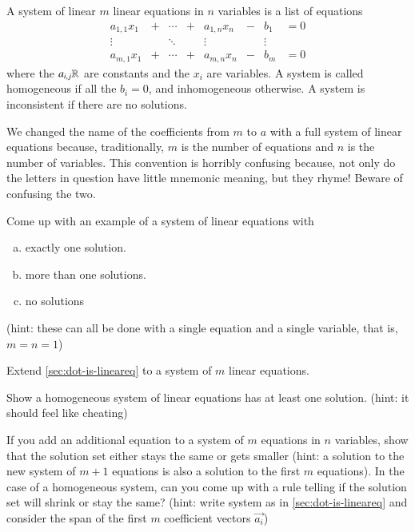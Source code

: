 \documentclass[Main.tex]{subfiles}
\begin{document}
\begin{Def}
  \label{sec:systemdef}
  A system of linear $m$ linear equations in $n$ variables is a list of equations
  \[\begin{array}{ccccccccc}
    a_{1,1}x_1 & + & \cdots & + & a_{1,n}x_n & - & b_1 & = 0\\
    \vdots     &   & \ddots &   & \vdots     &   & \vdots\\
    a_{m,1}x_1 & + & \cdots & + & a_{m,n}x_n & - & b_m & = 0
  \end{array}\]
  where the $a_{i,j}\mathbb{R}$ are constants and the $x_i$ are variables.
  A system is called homogeneous if all the $b_i=0$, and inhomogeneous otherwise.  
  A system is inconsistent if there are no solutions.  
\end{Def}

\begin{Remark}
  \label{sec:confusing}
  We changed the name of the coefficients from $m$ to $a$ with a full system of linear equations because, traditionally, 
  $m$ is the number of equations and $n$ is the number of variables.  
  This convention is horribly confusing because, not only do the letters in question have little mnemonic meaning, but they rhyme!  
  Beware of confusing the two.  
\end{Remark}

\begin{ImpEx}
  Come up with an example of a system of linear equations with
  \begin{enumerate}[a)]
  \item exactly one solution.
  \item more than one solutions.
  \item no solutions
  \end{enumerate}
  (hint: these can all be done with a single equation and a single variable, that is, $m=n=1$)
\end{ImpEx}

\begin{EasyEx}
  Extend \ref{sec:dot-is-lineareq} to a system of $m$ linear equations.  
\end{EasyEx}

\begin{EasyEx}
  Show a homogeneous system of linear equations has at least one solution.  (hint: it should feel like cheating)
\end{EasyEx}

\begin{Ex}
  If you add an additional equation to a system of $m$ equations in $n$ variables, show that the solution set either stays the same or gets smaller (hint: a solution to the new system of $m+1$ equations is also a solution to the first $m$ equations).  
  In the case of a homogeneous system, can you come up with a rule telling if the solution set will shrink or stay the same? (hint: write system as in \ref{sec:dot-is-lineareq} and consider the span of the first $m$ coefficient vectors $\vec{a_i}$)
\end{Ex}
\end{document}

